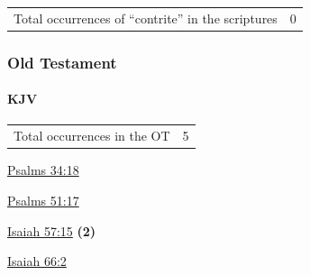 	\begin{tabular}{ll}
		Total occurrences of ``contrite'' in the scriptures & 0 \\
	\end{tabular}

	\subsubsection{Old Testament} %
		\label{CONTRITE-OT}
	
		\paragraph{KJV}
			\label{CONTRITE-OT-KJV}
	
			\begin{tabular}{ll}
				Total occurrences in the OT & 5
			\end{tabular}
			
			\begin{compactdesc}
				\item[{\hyperref[PSALMS-34-18]{Psalms 34:18}}]
				\item[{\hyperref[PSALMS-51-17]{Psalms 51:17}}]
				\item[{\hyperref[ISAIAH-57-15]{Isaiah 57:15}}] \textbf{(2)}
				\item[{\hyperref[ISAIAH-66-2]{Isaiah 66:2}}]
			\end{compactdesc}
			
		
			
				
						
